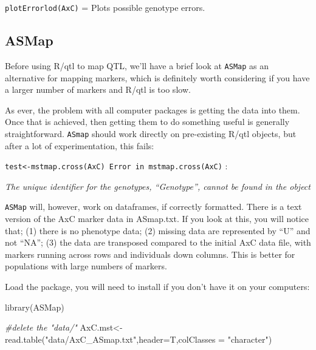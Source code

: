 \documentclass[
]{book}
\newenvironment{Shaded}{\begin{snugshade}}{\end{snugshade}}
\newcommand{\AttributeTok}[1]{\textcolor[rgb]{0.77,0.63,0.00}{#1}}
\newcommand{\CommentTok}[1]{\textcolor[rgb]{0.56,0.35,0.01}{\textit{#1}}}
\newcommand{\FunctionTok}[1]{\textcolor[rgb]{0.00,0.00,0.00}{#1}}
\newcommand{\NormalTok}[1]{#1}
\newcommand{\OtherTok}[1]{\textcolor[rgb]{0.56,0.35,0.01}{#1}}
\newcommand{\StringTok}[1]{\textcolor[rgb]{0.31,0.60,0.02}{#1}}
\begin{document}
\texttt{plotErrorlod(AxC)} = Plots possible genotype errors.

\hypertarget{asmap}{%
\subsection{ASMap}\label{asmap}}

Before using R/qtl to map QTL, we'll have a brief look at \texttt{ASMap} as an alternative for mapping markers, which is definitely worth considering if you have a larger number of markers and R/qtl is too slow.

As ever, the problem with all computer packages is getting the data into them. Once that is achieved, then getting them to do something useful is generally straightforward. \texttt{ASmap} should work directly on pre-existing R/qtl objects, but after a lot of experimentation, this fails:

\texttt{test\textless{}-mstmap.cross(AxC)\ Error\ in\ mstmap.cross(AxC)} :

\emph{The unique identifier for the genotypes, ``Genotype'', cannot be found in the object}

\texttt{ASMap} will, however, work on dataframes, if correctly formatted. There is a text version of the AxC marker data in ASmap.txt. If you look at this, you will notice that; (1) there is no phenotype data; (2) missing data are represented by ``U'' and not ``NA''; (3) the data are transposed compared to the initial AxC data file, with markers running across rows and individuals down columns. This is better for populations with large numbers of markers.

Load the package, you will need to install if you don't have it on your computers:

\begin{Shaded}
\begin{Highlighting}[]
\FunctionTok{library}\NormalTok{(ASMap)}
\end{Highlighting}
\end{Shaded}

\begin{Shaded}
\begin{Highlighting}[]
\CommentTok{\#delete the "data/"}
\NormalTok{AxC.mst}\OtherTok{\textless{}{-}}\FunctionTok{read.table}\NormalTok{(}\StringTok{"data/AxC\_ASmap.txt"}\NormalTok{,}\AttributeTok{header=}\NormalTok{T,}\AttributeTok{colClasses =} \StringTok{"character"}\NormalTok{) }
\end{Highlighting}
\end{Shaded}
\end{document}
